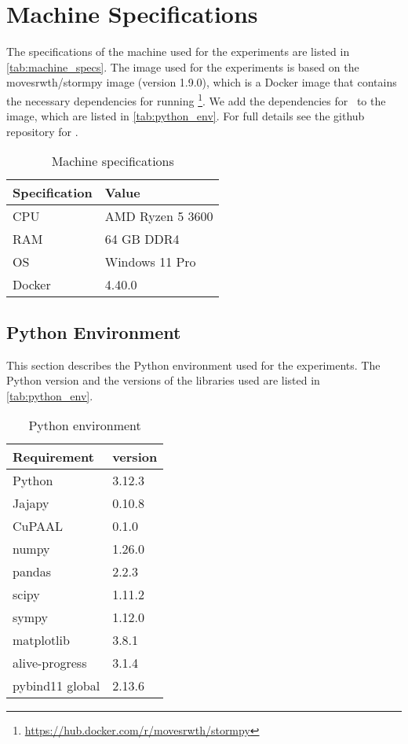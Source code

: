 \section{Machine Specifications}\label{sec:machine_specs}
The specifications of the machine used for the experiments are listed in \autoref{tab:machine_specs}.
The image used for the experiments is based on the movesrwth/stormpy image (version 1.9.0), which is a Docker image that contains the necessary dependencies for running \Jajapy\footnote{\url{https://hub.docker.com/r/movesrwth/stormpy}}.
We add the dependencies for \Cupaal\ to the image, which are listed in \autoref{tab:python_env}.
For full details see the github repository for \Cupaal.

\begin{table}[htb!]
    \centering
    \caption{Machine specifications}
    \label{tab:machine_specs}
    \begin{tabular}{ll}
        \toprule
        Specification & Value            \\
        \midrule
        CPU           & AMD Ryzen 5 3600 \\
        RAM           & 64 GB DDR4       \\
        OS            & Windows 11 Pro   \\
        Docker        & 4.40.0           \\
        \bottomrule
    \end{tabular}
\end{table}

\subsection{Python Environment}\label{subsec:python_env}
This section describes the Python environment used for the experiments. The Python version and the versions of the libraries used are listed in \autoref{tab:python_env}.

\begin{table}[htb!]
    \centering
    \caption{Python environment}
    \label{tab:python_env}
    \begin{tabular}{ll}
        \toprule
        Requirement     & version \\
        \midrule
        Python          & 3.12.3  \\
        Jajapy          & 0.10.8  \\
        CuPAAL          & 0.1.0   \\
        numpy           & 1.26.0  \\
        pandas          & 2.2.3   \\
        scipy           & 1.11.2  \\
        sympy           & 1.12.0  \\
        matplotlib      & 3.8.1   \\
        alive-progress  & 3.1.4   \\
        pybind11 global & 2.13.6  \\
        \bottomrule
    \end{tabular}
\end{table}